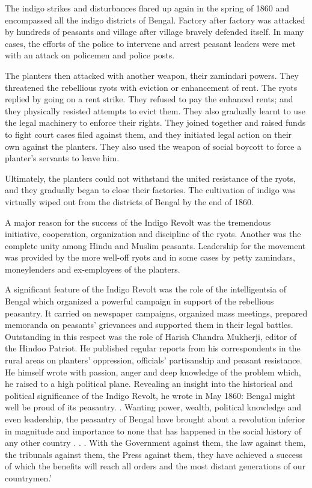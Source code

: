 The indigo strikes and disturbances flared up again in the spring of 1860 and encompassed all the indigo districts of Bengal. Factory after factory was attacked by hundreds of peasants and village after village bravely defended itself. In many cases, the efforts of the police to intervene and arrest peasant leaders were met with an attack on policemen and police posts.

The planters then attacked with another weapon, their zamindari powers. They threatened the rebellious ryots with eviction or enhancement of rent. The ryots replied by going on a rent strike. They refused to pay the enhanced rents; and they physically resisted attempts to evict them. They also gradually learnt to use the legal machinery to enforce their rights. They joined together and raised funds to fight court cases filed against them, and they initiated legal action on their own against the planters. They also used the weapon of social boycott to force a planter’s servants to leave him.

Ultimately, the planters could not withstand the united resistance of the ryots, and they gradually began to close their factories. The cultivation of indigo was virtually wiped out from the districts of Bengal by the end of 1860.

A major reason for the success of the Indigo Revolt was the tremendous initiative, cooperation, organization and discipline of the ryots. Another was the complete unity among Hindu and Muslim peasants. Leadership for the movement was provided by the more well-off ryots and in some cases by petty zamindars, moneylenders and ex-employees of the planters.

A significant feature of the Indigo Revolt was the role of the intelligentsia of Bengal which organized a powerful campaign in support of the rebellious peasantry. It carried on newspaper campaigns, organized mass meetings, prepared memoranda on peasants’ grievances and supported them in their legal battles. Outstanding in this respect was the role of Harish Chandra Mukherji, editor of the Hindoo Patriot. He published regular reports from his correspondents in the rural areas on planters’ oppression, officials’ partisanship and peasant resistance. He himself wrote with passion, anger and deep knowledge of the problem which, he raised to a high political plane. Revealing an insight into the historical and political significance of the Indigo Revolt, he wrote in May 1860: Bengal might well be proud of its peasantry. . Wanting power, wealth, political knowledge and even leadership, the peasantry of Bengal have brought about a revolution inferior in magnitude and importance to none that has happened in the social history of any other country . . . With the Government against them, the law against them, the tribunals against them, the Press against them, they have achieved a success of which the benefits will reach all orders and the most distant generations of our countrymen.’

